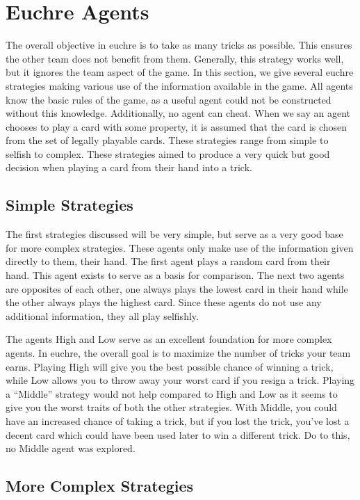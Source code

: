 
\section{Euchre Agents}

The overall objective in euchre is to take as many tricks as possible. This ensures the other team does not benefit from them.
Generally, this strategy works well, but it ignores the team aspect of the game. In this section, we give several euchre strategies
making various use of the information available in the game. All agents know the basic rules of the game, as a useful agent could
not be constructed without this knowledge. Additionally, no agent can cheat. When we say an agent chooses to play a card with some
property, it is assumed that the card is chosen from the set of legally playable cards. These strategies range from simple to selfish to
complex. These strategies aimed to produce a very quick but good decision when playing a card from their hand into a trick.


\subsection{Simple Strategies}

The first strategies discussed will be very simple, but serve as a very good base for more complex strategies. These agents only make use
of the information given directly to them, their hand. The first agent plays a random card from their hand. This agent exists to serve
as a basis for comparison. The next two agents are opposites of each other, one always plays the lowest card in their hand while
the other always plays the highest card. Since these agents do not use any additional information, they all play selfishly.

The agents High and Low serve as an excellent foundation for more complex agents. In euchre, the overall goal is to maximize the number
of tricks your team earns. Playing High will give you the best possible chance of winning a trick, while Low allows you to throw away
your worst card if you resign a trick. Playing a ``Middle'' strategy would not help compared to High and Low as it seems to give you
the worst traits of both the other strategies. With Middle, you could have an increased chance of taking a trick, but if you lost the trick,
you've lost a decent card which could have been used later to win a different trick. Do to this, no Middle agent was explored.


\subsection{More Complex Strategies}

